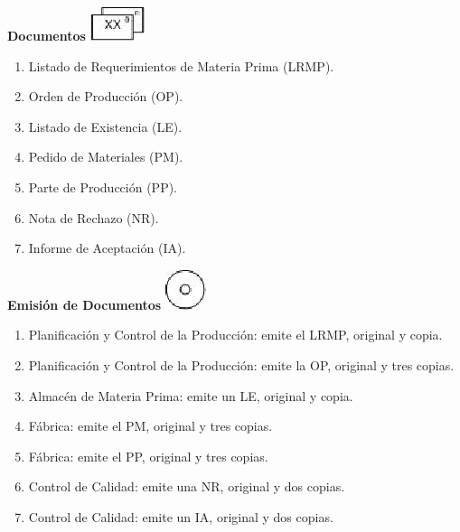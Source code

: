 \begin{center}
  \textbf{Documentos}
  \includegraphics{./Images/Simbolos/simbolo-Documentos.png}
\end{center}
\begin{enumerate}
  \item Listado de Requerimientos de Materia Prima (LRMP).
  \item Orden de Producci\'on (OP).
  \item Listado de Existencia (LE).
  \item Pedido de Materiales (PM).
  \item Parte de Producci\'on (PP).
  \item Nota de Rechazo (NR).
  \item Informe de Aceptaci\'on (IA).
\end{enumerate}

\begin{center}
  \textbf{Emisión de Documentos}
  \includegraphics{./Images/Simbolos/simbolo-Emision-de-Documentos.png}
\end{center}
\begin{enumerate}
  \item Planificaci\'on y Control de la Producci\'on: emite el LRMP, original y copia.
  \item Planificaci\'on y Control de la Producci\'on: emite la OP, original y tres copias. 
  \item Almac\'en de Materia Prima: emite un LE, original y copia.
  \item F\'abrica: emite el PM, original y tres copias.
  \item F\'abrica: emite el PP, original y tres copias.
  \item Control de Calidad: emite una NR, original y dos copias.
  \item Control de Calidad: emite un IA, original y dos copias.
\end{enumerate}

